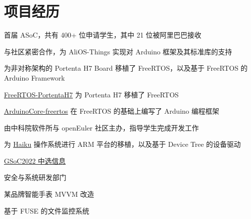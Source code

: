 \documentclass[]{deedy-resume-openfont}
\begin{document}
\begin{minipage}[t]{0.73\textwidth} 

\section{项目经历}
\vspace{\topsep}
\begin{tightemize}
    \item 首届 ASoC，共有 400+ 位申请学生，其中 21 位被阿里巴巴接收
    \item 与社区紧密合作，为 AliOS-Things 实现对 Arduino 框架及其标准库的支持
\end{tightemize}
\sectionsep

\begin{tightemize}
\item 为非对称架构的 Portenta H7 Board 移植了 FreeRTOS，以及基于 FreeRTOS 的 Arduino Framework
\item \href{https://github.com/MRNIU/FreeRTOS-PortentaH7}{FreeRTOS-PortentaH7} 为 Portenta H7 移植了 FreeRTOS
\item \href{https://github.com/MRNIU/ArduinoCore-freertos}{ArduinoCore-freertos} 在 FreeRTOS 的基础上编写了 Arduino 编程框架
\end{tightemize}
\sectionsep

\begin{tightemize}
\item 由中科院软件所与 openEuler 社区主办，指导学生完成开发工作
\end{tightemize}
\sectionsep

\begin{tightemize}
\item 为 \href{https://www.haiku-os.org}{Haiku} 操作系统进行 ARM 平台的移植，以及基于 Device Tree 的设备驱动
\item \href{https://summerofcode.withgoogle.com/programs/2022/projects/y2L1QWf1}{GSoC2022 中选信息}
\end{tightemize}
\sectionsep

\begin{tightemize}
\item 安全与系统研发部门
\item 某品牌智能手表 MVVM 改造
\item 基于 FUSE 的文件监控系统
\end{tightemize}
\sectionsep


\end{minipage}
\end{document}
